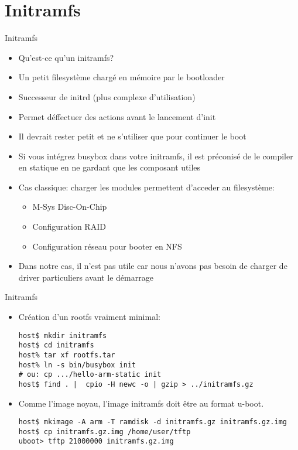 
\section{Initramfs}

\begin{frame}[fragile=singleslide]{Initramfs}
  \begin{itemize}
  \item Qu'est-ce qu'un initramfs?
  \item Un petit filesystème chargé en mémoire par le bootloader
  \item Successeur de initrd (plus complexe d'utilisation)
  \item Permet déffectuer des actions avant le lancement d'init
  \item Il devrait rester petit et ne s'utiliser que pour continuer le
    boot
  \item  Si  vous  intégrez  busybox  dans  votre  initramfs,  il  est
    préconisé  de  le compiler  en  statique  en  ne gardant  que  les
    composant utiles
  \item  Cas classique:  charger les  modules permettent  d'acceder au
    filesystème:
    \begin{itemize}
    \item M-Sys Disc-On-Chip
    \item Configuration RAID
    \item Configuration réseau pour booter en NFS
    \end{itemize}
  \item Dans notre cas, il n'est pas utile car nous n'avons pas besoin
    de charger de driver particuliers avant le démarrage
  \end{itemize}
\end{frame}

\begin{frame}[fragile=singleslide]{Initramfs}
  \begin{itemize}
  \item Création d'un rootfs vraiment minimal:
    \begin{lstlisting}
host$ mkdir initramfs
host$ cd initramfs
host% tar xf rootfs.tar
host% ln -s bin/busybox init 
# ou: cp .../hello-arm-static init
host$ find . |  cpio -H newc -o | gzip > ../initramfs.gz
    \end{lstlisting}
  \item Comme l'image noyau, l'image initramfs doit être au format u-boot.
    \begin{lstlisting}
host$ mkimage -A arm -T ramdisk -d initramfs.gz initramfs.gz.img
host$ cp initramfs.gz.img /home/user/tftp
uboot> tftp 21000000 initramfs.gz.img
    \end{lstlisting}
  \end{itemize}
\end{frame}

